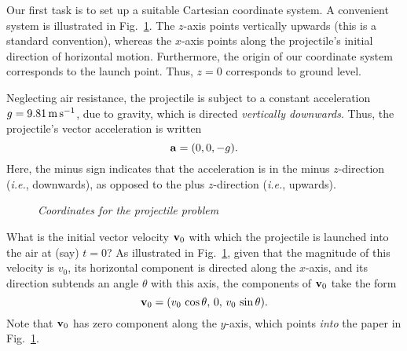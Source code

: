 Our first task is to set up a suitable  Cartesian coordinate system.
A convenient system is illustrated in Fig.~\ref{f16}. The $z$-axis points vertically
upwards (this is a standard convention), whereas the $x$-axis points along the
projectile's
initial direction of horizontal motion. Furthermore, the origin of our
coordinate system  corresponds to the launch point. Thus, $z=0$ corresponds
to ground level.

Neglecting air resistance,
the projectile is subject to a constant acceleration $g=9.81\,{\rm m}\,{\rm s}^{-1}$,
due to gravity, which is directed {\em vertically downwards}. Thus, the projectile's
vector acceleration is written
\begin{equation}
{\bf a} = (0,0,-g).\label{e342}
\end{equation}
Here, the minus sign indicates that the acceleration is in the minus $z$-direction
({\em i.e.}, downwards), as opposed to the plus $z$-direction ({\em i.e.}, upwards).

\begin{figure}
\epsfysize=2in
\centerline{}
\caption{\em Coordinates for the projectile problem}\label{f16}   
\end{figure}

What is the initial vector velocity ${\bf v}_0$ with which the projectile is launched
into the air at (say) $t=0$? As illustrated in Fig.~\ref{f16}, 
given that the magnitude of this velocity is $v_0$, its horizontal component
 is directed along the $x$-axis, and  its direction subtends an angle $\theta$
with this axis, the components of ${\bf v}_0$ take the form
\begin{equation}
{\bf v}_0 = (v_0\,\cos\theta,\,0,\,v_0\,\sin\theta).\label{e343}
\end{equation}
Note that ${\bf v}_0$ has zero component along the $y$-axis, which points
{\em into} the paper in Fig.~\ref{f16}.

